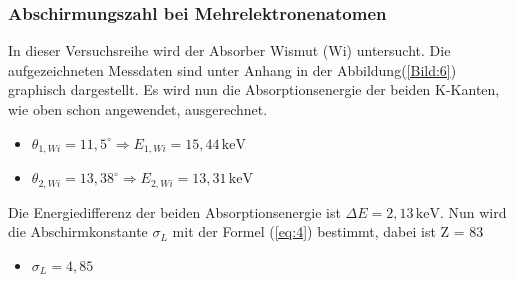\subsubsection{Abschirmungszahl bei Mehrelektronenatomen}
In dieser Versuchsreihe wird der Absorber Wismut (Wi) untersucht.
Die aufgezeichneten Messdaten sind unter Anhang in der Abbildung(\ref{Bild:6}) graphisch dargestellt.
Es wird nun die Absorptionsenergie der beiden K-Kanten, wie oben schon angewendet, ausgerechnet.
\begin{itemize}
  \item $\theta_{1,Wi} = 11,5^\circ \Rightarrow E_{1,Wi} = 15,44 \,\text{keV}$
  \item $\theta_{2,Wi} = 13,38^\circ \Rightarrow E_{2,Wi} = 13,31 \,\text{keV}$
\end{itemize}
Die Energiedifferenz der beiden Absorptionsenergie ist $\Delta E = 2,13 \,\text{keV}$.
Nun wird die Abschirmkonstante $\sigma_L$ mit der Formel (\ref{eq:4}) bestimmt, dabei ist Z = 83
\begin{itemize}
  \item $\sigma_L = 4,85 $
\end{itemize}
